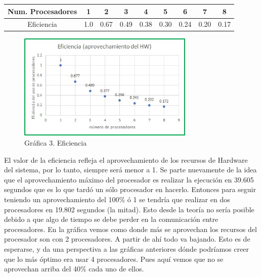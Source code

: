 \documentclass{report}
\begin{document}
\vspace{0.5cm}

\begin{center}
    \begin{tabular}{|c|c|c|c|c|c|c|c|c|}
        \hline
           Num. Procesadores & 1 & 2 & 3 & 4 & 5 & 6 & 7 & 8 \\
        \hline
            Eficiencia & 1.0 & 0.67 & 0.49 & 0.38 & 0.30 & 0.24 & 0.20 & 0.17 \\
        \hline
    \end{tabular}
\end{center}

\vspace{0.5cm}

\begin{figure}[h!]
    \centering
    \includegraphics[width = 0.75\textwidth]{Images/Eficiencia.jpeg}
    \caption{Gráfica 3. Eficiencia}
\end{figure}

\vspace{0.2cm}

El valor de la eficiencia refleja el aprovechamiento de los recursos de Hardware del sistema, por lo tanto, siempre será menor a 1. Se parte nuevamente de la idea que el aprovechamiento máximo del procesador es realizar la ejecución en 39.605 segundos que es lo que tardó un sólo procesador en hacerlo. Entonces para seguir teniendo un aprovechamiento del 100\% ó 1 se tendría que realizar en dos procesadores en 19.802 segundos (la mitad). Esto desde la teoría no sería posible debido a que algo de tiempo se debe perder en la comunicación entre procesadores. En la gráfica vemos como donde más se aprovechan los recursos del procesador son con 2 procesadores. A partir de ahí todo va bajando. Esto es de esperarse, y da una perspectiva a las gráficas anteriores dónde podríamos creer que lo más óptimo era usar 4 procesadores. Pues aquí vemos que no se aprovechan arriba del 40\% cada uno de ellos.\medskip
\end{document}
